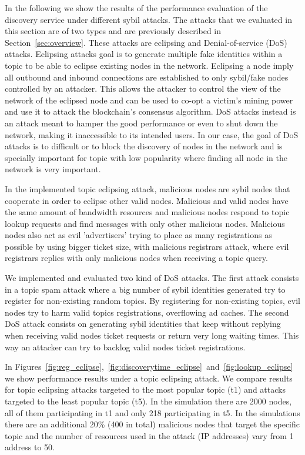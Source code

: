In the following we show the results of the performance evaluation of the discovery service under different sybil attacks.  The attacks that we evaluated in this section are of two types and are previously described in Section~\ref{sec:overview}. 
These attacks are eclipsing  and Denial-of-service (DoS) attacks.
Eclipsing attacks goal is to generate multiple fake identities within a topic to be able to eclipse existing nodes in the network.
Eclipsing a node imply all outbound and inbound connections are established to only sybil/fake nodes controlled by an attacker.
This allows the attacker to control the view of the network of the eclipsed node and can be used to co-opt a victim's mining power and use it to attack the blockchain's consensus algorithm.
DoS attacks instead is an attack meant to hamper the good performance or even to shut down the network, making it inaccessible to its intended users.  
In our case,  the goal of DoS attacks is to difficult or to block the discovery of nodes in the network and is specially important for topic with low popularity where finding all node in the network is very important.

In the implemented topic eclipsing attack,  malicious nodes are sybil nodes that cooperate in order to eclipse other valid nodes.
Malicious and valid nodes have the same amount of bandwidth resources and malicious nodes respond to topic lookup requests and find messages with only other malicious nodes.
Malicious nodes also act as evil 'advertisers' trying to place as many registrations as possible by using bigger ticket size,  with malicious registrars attack,  where evil registrars replies with only malicious nodes when receiving a topic query.

We implemented and evaluated two kind of DoS attacks.  
The first attack consists in a topic spam attack where a big number of sybil identities generated try to register for non-existing random topics.
By registering for non-existing topics,  evil nodes try to harm valid topics registrations, overflowing ad caches.
The second DoS attack consists on generating sybil identities that keep without replying when receiving valid nodes ticket requests or return very long waiting times. 
This way an attacker can try to backlog valid nodes ticket registrations.

In Figures~\ref{fig:reg_eclipse},~\ref{fig:discoverytime_eclipse}~and~\ref{fig:lookup_eclipse} we show performance results under a
topic eclipsing attack.
We compare results for topic eclipsing attacks targeted to the most popular topic (t1) and attacks targeted to the least popular topic (t5). 
In the simulation there are 2000 nodes, all of them participating in t1 and only 218 participating in t5. 
In the simulations there are an additional 20\% (400 in total) malicious nodes that target the specific topic and the number of resources used in the attack (IP addresses) vary from 1 address to 50.


